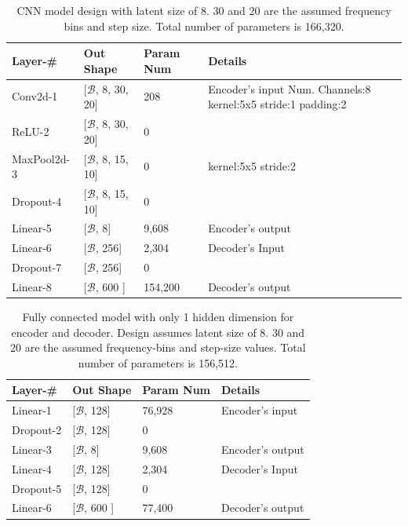 \documentclass[\main/thesis.tex]{subfiles}
\begin{document}
\begin{table}[]
\begin{tabular}{|p{28mm}|p{25mm}|p{23mm}|p{50mm}|}
\hline
Layer-\# & Out Shape & Param Num & Details  \\ \hline
Conv2d-1 & [$\mathcal{B}$, 8, 30, 20] &   208 & Encoder's input \newline
Num. Channels:8\newline
kernel:5x5\newline                  
stride:1\newline    
padding:2 \\ \hline
ReLU-2 & [$\mathcal{B}$, 8, 30, 20] &   0 & \\  \hline
MaxPool2d-3 & [$\mathcal{B}$, 8, 15, 10] & 0 &  kernel:5x5 \newline
stride:2 \\ \hline
Dropout-4 & [$\mathcal{B}$, 8, 15, 10] & 0 &  \\ \hline
Linear-5 & [$\mathcal{B}$, 8] & 9,608 & Encoder's output \\ \hline
Linear-6 & [$\mathcal{B}$, 256] & 2,304 & Decoder's Input \\ \hline
Dropout-7 & [$\mathcal{B}$, 256] & 0 &  \\ \hline
Linear-8 & [$\mathcal{B}$, 600 ] &  154,200& Decoder's output\\ \hline
\end{tabular}
\caption{CNN model design with latent size of 8. 30 and 20 are the assumed frequency bins and step size. Total number of parameters is 166,320. }
\label{table:CNNAUTOENCODER}
\end{table}

\begin{table}[]
\begin{tabular}{|p{28mm}|p{25mm}|p{23mm}|p{50mm}|}
\hline
Layer-\# & Out Shape & Param Num & Details  \\ \hline
Linear-1 & [$\mathcal{B}$, 128]  & 76,928 & Encoder's input \\ \hline
Dropout-2 & [$\mathcal{B}$, 128] & 0 &  \\ \hline
Linear-3 & [$\mathcal{B}$, 8] & 9,608 & Encoder's output \\ \hline
Linear-4 & [$\mathcal{B}$, 128] & 2,304 & Decoder's Input \\ \hline
Dropout-5 & [$\mathcal{B}$, 128]  & 0 &  \\ \hline
Linear-6  & [$\mathcal{B}$, 600 ] &  77,400 &Decoder's output\\ \hline
\end{tabular}
\caption{Fully connected model with only 1 hidden dimension for encoder and decoder. Design assumes latent size of 8. 30 and 20 are the assumed frequency-bins and step-size values. Total number of parameters is 156,512.}
\label{table:FC1_AUTOENCODER}
\end{table}
\end{document}
